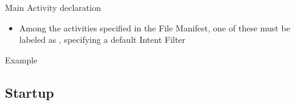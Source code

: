 \documentclass{beamer}
\begin{document}

  \begin{frame}[fragile]{Main Activity declaration}
    \begin{itemize}
      \item Among the activities specified in the File Manifest, one of these must be labeled as 
      , specifying a default Intent Filter
    \end{itemize}

    \begin{exampleblock}{Example}
      
    \end{exampleblock}
  \end{frame}

\subsection{Startup}
\end{document}
